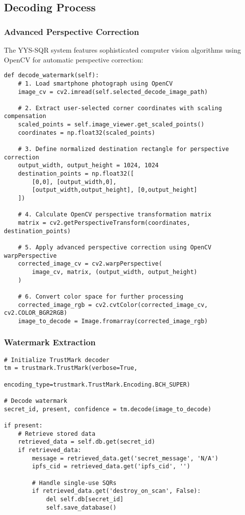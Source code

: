 \documentclass[12pt,a4paper]{article}
\begin{document}
\subsection{Decoding Process}

\subsubsection{Advanced Perspective Correction}

The YYS-SQR system features sophisticated computer vision algorithms using OpenCV for automatic perspective correction:

\begin{lstlisting}[caption=Advanced OpenCV Perspective Correction Algorithm]
def decode_watermark(self):
    # 1. Load smartphone photograph using OpenCV
    image_cv = cv2.imread(self.selected_decode_image_path)
    
    # 2. Extract user-selected corner coordinates with scaling compensation
    scaled_points = self.image_viewer.get_scaled_points()
    coordinates = np.float32(scaled_points)
    
    # 3. Define normalized destination rectangle for perspective correction
    output_width, output_height = 1024, 1024
    destination_points = np.float32([
        [0,0], [output_width,0], 
        [output_width,output_height], [0,output_height]
    ])
    
    # 4. Calculate OpenCV perspective transformation matrix
    matrix = cv2.getPerspectiveTransform(coordinates, destination_points)
    
    # 5. Apply advanced perspective correction using OpenCV warpPerspective
    corrected_image_cv = cv2.warpPerspective(
        image_cv, matrix, (output_width, output_height)
    )
    
    # 6. Convert color space for further processing
    corrected_image_rgb = cv2.cvtColor(corrected_image_cv, cv2.COLOR_BGR2RGB)
    image_to_decode = Image.fromarray(corrected_image_rgb)
\end{lstlisting}

\subsubsection{Watermark Extraction}

\begin{lstlisting}[caption=Watermark Extraction]
# Initialize TrustMark decoder
tm = trustmark.TrustMark(verbose=True, 
                       encoding_type=trustmark.TrustMark.Encoding.BCH_SUPER)

# Decode watermark
secret_id, present, confidence = tm.decode(image_to_decode)

if present:
    # Retrieve stored data
    retrieved_data = self.db.get(secret_id)
    if retrieved_data:
        message = retrieved_data.get('secret_message', 'N/A')
        ipfs_cid = retrieved_data.get('ipfs_cid', '')
        
        # Handle single-use SQRs
        if retrieved_data.get('destroy_on_scan', False):
            del self.db[secret_id]
            self.save_database()
\end{lstlisting}
\end{document}
